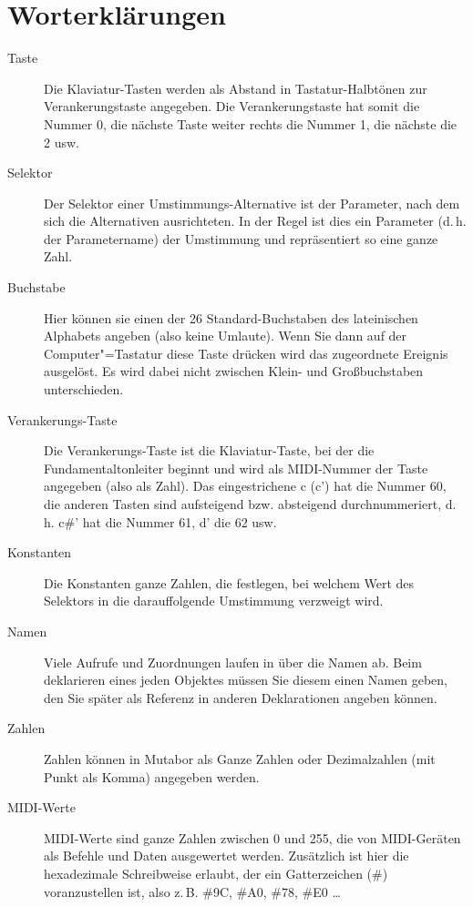 

\section{Worterklärungen}\label{sec:worterklarungen}
\begin{description}
\item[Taste] Die Klaviatur-Tasten werden als Abstand in
  Tastatur-Halbtönen zur Verankerungstaste angegeben. Die
  Verankerungstaste hat somit die Nummer 0, die nächste Taste weiter
  rechts die Nummer 1, die nächste die 2 usw.

\item[Selektor] Der Selektor einer Umstimmungs-Alternative ist der
  Parameter, nach dem sich die Alternativen ausrichteten. In der Regel
  ist dies ein Parameter (d.\,h. der Parametername) der Umstimmung und
  repräsentiert so eine ganze Zahl.

\item[Buchstabe] Hier können sie einen der 26 Standard-Buchstaben des
  lateinischen Alphabets angeben (also keine Umlaute). Wenn Sie dann
  auf der Computer"=Tastatur diese Taste drücken wird das zugeordnete
  Ereignis ausgelöst. Es wird dabei nicht zwischen Klein- und
  Großbuchstaben unterschieden.

\item[Verankerungs-Taste] Die Verankerungs-Taste ist die
  Klaviatur-Taste, bei der die Fundamentaltonleiter beginnt und wird
  als MIDI-Nummer der Taste angegeben (also als Zahl). Das
  eingestrichene c (c') hat die Nummer 60, die anderen Tasten sind
  aufsteigend bzw. absteigend durchnummeriert, d.\,h.  c\#' hat die
  Nummer 61, d' die 62 usw.

\item[Konstanten] Die Konstanten ganze Zahlen, die festlegen, bei
  welchem Wert des Selektors in die
  darauffolgende Umstimmung verzweigt wird.

\item[Namen] Viele Aufrufe und Zuordnungen laufen in \mutabor{}
  über die Namen ab. Beim deklarieren eines jeden Objektes müssen Sie
  diesem einen Namen geben, den Sie später als Referenz in anderen
  Deklarationen angeben können.

\item[Zahlen] Zahlen können in Mutabor als Ganze Zahlen oder
  Dezimalzahlen (mit Punkt als Komma) angegeben werden.

\item[MIDI-Werte] MIDI-Werte sind ganze Zahlen zwischen 0 und 255, die
  von MIDI-Geräten als Befehle und Daten ausgewertet werden.
  Zusätzlich ist hier die hexadezimale Schreibweise erlaubt, der ein
  Gatterzeichen (\#) voranzustellen ist, also z.\,B. \#9C, \#A0, \#78,
  \#E0 \dots
\end{description}


